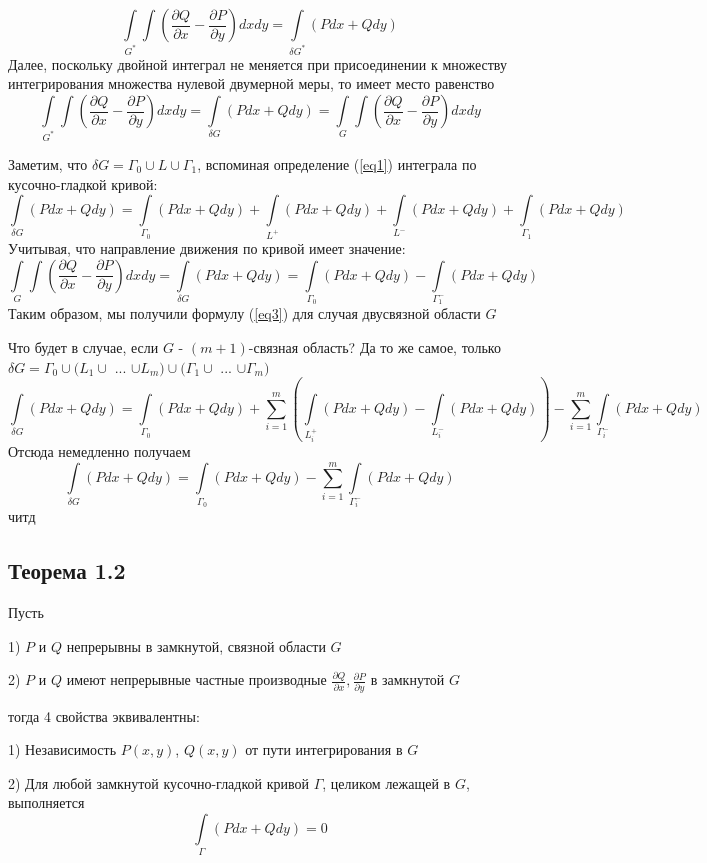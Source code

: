 \documentclass[12pt, english]{article}
\begin{document}
$$
\int\limits_{G^*} \int (\frac{\partial Q}{\partial x} 
-
\frac{\partial P}{\partial y}) dxdy 
=
\int\limits_{\delta G^*} (Pdx + Qdy)
$$	
Далее, поскольку двойной интеграл не меняется при присоединении к множеству интегрирования множества нулевой двумерной меры, то имеет место равенство
$$
\int\limits_{G^*} \int (\frac{\partial Q}{\partial x} 
-
\frac{\partial P}{\partial y}) dxdy 
=
\int\limits_{\delta G} (Pdx + Qdy)
= 
\int\limits_{G} \int (\frac{\partial Q}{\partial x} 
-
\frac{\partial P}{\partial y}) dxdy 
$$

Заметим, что $\delta G = \Gamma_0 \cup L \cup \Gamma_1$, вспоминая определение (\ref{eq1}) интеграла по кусочно-гладкой кривой:
$$
\int\limits_{\delta G} (Pdx + Qdy)
=
\int\limits_{\Gamma_0} (Pdx + Qdy)
+
\int\limits_{L^+} (Pdx + Qdy)
+
\int\limits_{L^-} (Pdx + Qdy)
+
\int\limits_{\Gamma_1} (Pdx + Qdy)
$$
Учитывая, что направление движения по кривой имеет значение:
$$
\int\limits_{G} \int (\frac{\partial Q}{\partial x} 
-
\frac{\partial P}{\partial y}) dxdy 
=
\int\limits_{\delta G} (Pdx + Qdy)
=
\int\limits_{\Gamma_0} (Pdx + Qdy)
-
\int\limits_{\Gamma_1^-} (Pdx + Qdy)
$$
Таким образом, мы получили формулу (\ref{eq3}) для случая двусвязной области $G$

Что будет в случае, если $G$ - $(m+1)$-связная область?
Да то же самое, только 
$\delta G = \Gamma_0 \cup (L_1 \cup$ ... $ \cup L_m)\cup (\Gamma_1 \cup$ ... $\cup\Gamma_m)$
$$
\int\limits_{\delta G} (Pdx + Qdy)
=
\int\limits_{\Gamma_0} (Pdx + Qdy)
+
\sum_{i = 1}^m (\int\limits_{L_i^+}(Pdx + Qdy) - \int\limits_{L_i^-} (Pdx + Qdy))
-
\sum_{i = 1}^m \int\limits_{\Gamma_i^-} (Pdx + Qdy)
$$
Отсюда немедленно получаем
$$
\int\limits_{\delta G} (Pdx + Qdy)
=
\int\limits_{\Gamma_0} (Pdx + Qdy)
-
\sum_{i = 1}^m \int\limits_{\Gamma_i^-} (Pdx + Qdy)
$$
читд

\subsection{Теорема 1.2}

Пусть

1)  $P$ и $Q$ непрерывны в замкнутой, связной области $G$


2) $P$ и $Q$ имеют непрерывные частные производные $\frac{\partial Q}{\partial x},\frac{\partial P}{\partial y} $ в замкнутой $G$

тогда 4 свойства эквивалентны:


1) Независимость $P(x,y)$, $Q(x,y)$ от пути интегрирования в $G$

2) Для любой замкнутой кусочно-гладкой кривой $\Gamma$, целиком лежащей в $G$, выполняется
$$
\int\limits_{\Gamma} (Pdx + Qdy) = 0
$$
\end{document}
